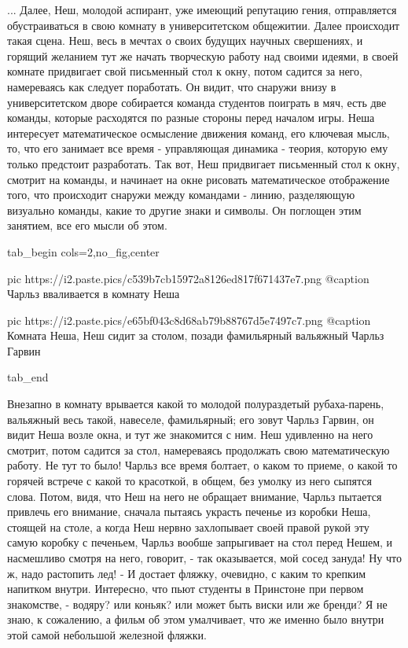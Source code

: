 ... Далее, Неш, молодой аспирант, уже имеющий репутацию гения, отправляется
обустраиваться в свою комнату в университетском общежитии. Далее происходит
такая сцена. Неш, весь в мечтах о своих будущих научных свершениях, и горящий
желанием тут же начать творческую работу над своими идеями, в своей комнате
придвигает свой письменный стол к окну, потом садится за него, намереваясь как
следует поработать.  Он видит, что снаружи внизу в университетском дворе
собирается команда студентов поиграть в мяч, есть две команды, которые
расходятся по разные стороны перед началом игры. Неша интересует математическое
осмысление движения команд, его ключевая мысль, то, что его занимает все время
- управляющая динамика - теория, которую ему только предстоит разработать.  Так
вот, Неш придвигает письменный стол к окну, смотрит на команды, и начинает на
окне рисовать математическое отображение того, что происходит снаружи между
командами - линию, разделяющую визуально команды, какие то другие знаки и
символы.  Он поглощен этим занятием, все его мысли об этом. 

\ifcmt
  tab_begin cols=2,no_fig,center

		 pic https://i2.paste.pics/c539b7cb15972a8126ed817f671437e7.png
		 @caption Чарльз вваливается в комнату Неша 

     pic https://i2.paste.pics/e65bf043c8d68ab79b88767d5e7497c7.png
		 @caption Комната Неша, Неш сидит за столом, позади фамильярный вальяжный Чарльз Гарвин

  tab_end
\fi


Внезапно в комнату
врывается какой то молодой полураздетый рубаха-парень, вальяжный весь такой,
навеселе, фамильярный; его зовут Чарльз Гарвин, он видит Неша возле окна, и тут
же знакомится с ним.  Неш удивленно на него смотрит, потом садится за стол,
намереваясь продолжать свою математическую работу. Не тут то было!  Чарльз все
время болтает, о каком то приеме, о какой то горячей встрече с какой то
красоткой, в общем, без умолку из него сыпятся слова.  Потом, видя, что Неш на
него не обращает внимание, Чарльз пытается привлечь его внимание, сначала
пытаясь украсть печенье из коробки Неша, стоящей на столе, а когда Неш нервно
захлопывает своей правой рукой эту самую коробку с печеньем, Чарльз вообше
запрыгивает на стол перед Нешем, и насмешливо смотря на него, говорит, - так
оказывается, мой сосед зануда! Ну что ж, надо растопить лед! - И достает
фляжку, очевидно, с каким то крепким напитком внутри.  Интересно, что пьют
студенты в Принстоне при первом знакомстве, - водяру? или коньяк? или может
быть виски или же бренди?  Я не знаю, к сожалению, а фильм об этом умалчивает,
что же именно было внутри этой самой небольшой железной фляжки. 
